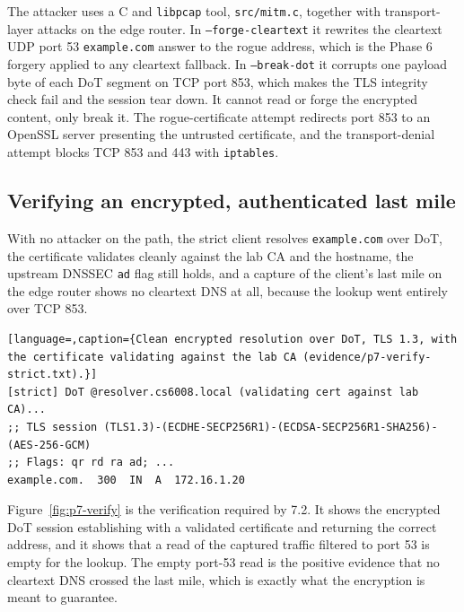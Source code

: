 \documentclass[11pt]{article}
\begin{document}
The attacker uses a C and \texttt{libpcap} tool, \texttt{src/mitm.c}, together with
transport-layer attacks on the edge router. In \texttt{--forge-cleartext} it
rewrites the cleartext UDP port 53 \texttt{example.com} answer to the rogue address,
which is the Phase 6 forgery applied to any cleartext fallback. In
\texttt{--break-dot} it corrupts one payload byte of each DoT segment on TCP port
853, which makes the TLS integrity check fail and the session tear down. It cannot
read or forge the encrypted content, only break it. The rogue-certificate attempt
redirects port 853 to an OpenSSL server presenting the untrusted certificate, and
the transport-denial attempt blocks TCP 853 and 443 with \texttt{iptables}.

\subsection{Verifying an encrypted, authenticated last mile}

With no attacker on the path, the strict client resolves \texttt{example.com} over
DoT, the certificate validates cleanly against the lab CA and the hostname, the
upstream DNSSEC \texttt{ad} flag still holds, and a capture of the client's last
mile on the edge router shows no cleartext DNS at all, because the lookup went
entirely over TCP 853.

\begin{lstlisting}[language=,caption={Clean encrypted resolution over DoT, TLS 1.3, with the certificate validating against the lab CA (evidence/p7-verify-strict.txt).}]
[strict] DoT @resolver.cs6008.local (validating cert against lab CA)...
;; TLS session (TLS1.3)-(ECDHE-SECP256R1)-(ECDSA-SECP256R1-SHA256)-(AES-256-GCM)
;; Flags: qr rd ra ad; ...
example.com.  300  IN  A  172.16.1.20
\end{lstlisting}


Figure~\ref{fig:p7-verify} is the verification required by 7.2.
It shows the encrypted DoT session establishing with a validated
certificate and returning the correct address, and it shows that a read of
the captured traffic filtered to port 53 is empty for the lookup. The empty
port-53 read is the positive evidence that no cleartext DNS crossed the last mile,
which is exactly what the encryption is meant to guarantee.
\end{document}

